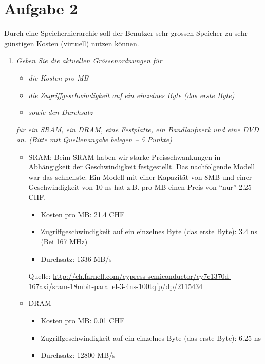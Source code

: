 \documentclass[10pt]{article}
\begin{document}
\section*{Aufgabe 2}
Durch eine Speicherhierarchie soll der Benutzer sehr grossen Speicher zu sehr günstigen Kosten (virtuell) nutzen können.
\begin{enumerate}[label=\alph*)]
	\item
		\textit{Geben Sie die aktuellen Grössenordnungen für}
			\begin{itemize}
				\item \textit{die Kosten pro MB}
				\item \textit{die Zugriffgeschwindigkeit auf ein einzelnes Byte (das erste Byte)}
				\item \textit{sowie den Durchsatz}
			\end{itemize}
		\textit{für ein SRAM, ein DRAM, eine Festplatte, ein Bandlaufwerk und eine DVD an. (Bitte mit Quellenangabe belegen – 5 Punkte)}
			
			\begin{itemize}
			
				\item SRAM: 
					Beim SRAM haben wir starke Preisschwankungen in Abhängigkeit der Geschwindigkeit festgestellt. Das nachfolgende Modell war das schnellste. Ein Modell mit einer Kapazität von 8MB und einer Geschwindigkeit von 10 ns hat z.B. pro MB einen Preis von "`nur"' 2.25 CHF.
					\begin{itemize}
						\item Kosten pro MB: 21.4 CHF
						\item Zugriffgeschwindigkeit auf ein einzelnes Byte (das erste Byte): 3.4 ns (Bei 167 MHz)
						\item Durchsatz: 1336 MB/s
					\end{itemize}
					Quelle: \url{http://ch.farnell.com/cypress-semiconductor/cy7c1370d-167axi/sram-18mbit-parallel-3-4ns-100tqfp/dp/2115434}

				\item DRAM
					\begin{itemize}
						\item Kosten pro MB: 0.01 CHF
						\item Zugriffgeschwindigkeit auf ein einzelnes Byte (das erste Byte): 6.25 ns
						\item Durchsatz: 12800 MB/s
					\end{itemize}
					

\end{itemize}
\end{enumerate}
\end{document}
